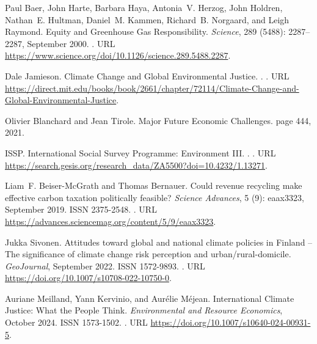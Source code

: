 \documentclass[12pt,english]{article}
\begin{document}
\begin{thebibliography}{55}
  Paul Baer, John Harte, Barbara Haya, Antonia~V. Herzog, John Holdren, Nathan~E.
    Hultman, Daniel~M. Kammen, Richard~B. Norgaard, and Leigh Raymond.
  \newblock Equity and {{Greenhouse Gas Responsibility}}.
  \newblock \emph{Science}, 289 (5488): 2287--2287, September
    2000.
  \newblock {}.
  \newblock URL \url{https://www.science.org/doi/10.1126/science.289.5488.2287}.
  
  Dale Jamieson.
  \newblock Climate {{Change}} and {{Global Environmental Justice}}.
  .
  \newblock {}.
  \newblock URL
    \url{https://direct.mit.edu/books/book/2661/chapter/72114/Climate-Change-and-Global-Environmental-Justice}.
  
  Olivier Blanchard and Jean Tirole.
  \newblock Major {{Future Economic Challenges}}.
  \newblock page 444, 2021.
  
  ISSP.
  \newblock International {{Social Survey Programme}}: {{Environment III}}.
  .
  \newblock {}.
  \newblock URL
    \url{https://search.gesis.org/research\_data/ZA5500?doi=10.4232/1.13271}.
  
  Liam~F. {Beiser-McGrath} and Thomas Bernauer.
  \newblock Could revenue recycling make effective carbon taxation politically
    feasible?
  \newblock \emph{Science Advances}, 5 (9): eaax3323, September
    2019.
  \newblock ISSN 2375-2548.
  \newblock {}.
  \newblock URL \url{https://advances.sciencemag.org/content/5/9/eaax3323}.
  
  Jukka Sivonen.
  \newblock Attitudes toward global and national climate policies in {{Finland}}
    -- {{The}} significance of climate change risk perception and
    urban/rural-domicile.
  \newblock \emph{GeoJournal}, September 2022.
  \newblock ISSN 1572-9893.
  \newblock {}.
  \newblock URL \url{https://doi.org/10.1007/s10708-022-10750-0}.
  
  Auriane Meilland, Yann Kervinio, and Aur{\'e}lie M{\'e}jean.
  \newblock International {{Climate Justice}}: {{What}} the {{People Think}}.
  \newblock \emph{Environmental and Resource Economics}, October 2024.
  \newblock ISSN 1573-1502.
  \newblock {}.
  \newblock URL \url{https://doi.org/10.1007/s10640-024-00931-5}.
  

\end{thebibliography}
\end{document}
